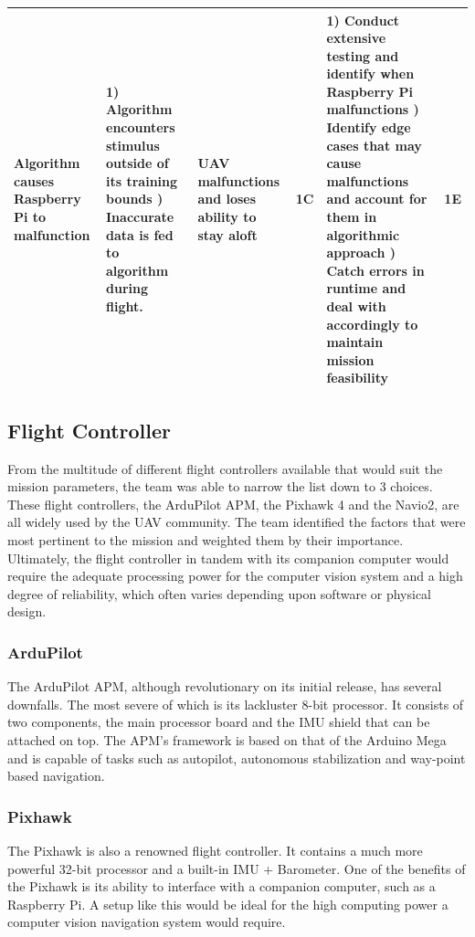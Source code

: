\begin{table}[]
{\begin{tabularx}{\linewidth}{XXXlXl}
                Algorithm causes Raspberry Pi to malfunction & 1) Algorithm encounters stimulus outside of its training bounds \newline 2) Inaccurate data is fed to algorithm during flight. & UAV malfunctions and loses ability to stay aloft & \cellcolor{red!25} 1C & 1) Conduct extensive testing and identify when Raspberry Pi malfunctions \newline 2) Identify edge cases that may cause malfunctions and account for them in algorithmic approach \newline 3) Catch errors in runtime and deal with accordingly to maintain mission feasibility & \cellcolor{green!25} 1E \\
                \bottomrule
                \end{tabularx}
                }
            \end{table}
	    
	\subsection{Flight Controller}
		From the multitude of different flight controllers available that would suit the mission parameters, the team was able to narrow the list down to 3 choices. These flight controllers, the ArduPilot APM, the Pixhawk 4 and the Navio2, are all widely used by the UAV community. The team identified the factors that were most pertinent to the mission and weighted them by their importance. Ultimately, the flight controller in tandem with its companion computer would require the adequate processing power for the computer vision system and a high degree of reliability, which often varies depending upon software or physical design.

		\subsubsection{ArduPilot}
			The ArduPilot APM, although revolutionary on its initial release, has several downfalls. The most severe of which is its lackluster 8-bit processor. It consists of two components, the main processor board and the IMU shield that can be attached on top. The APM’s framework is based on that of the Arduino Mega and is capable of tasks such as autopilot, autonomous stabilization and way-point based navigation.

		\subsubsection{Pixhawk}
			The Pixhawk is also a renowned flight controller. It contains a much more powerful 32-bit processor and a built-in IMU + Barometer. One of the benefits of the Pixhawk is its ability to interface with a companion computer, such as a Raspberry Pi. A setup like this would be ideal for the high computing power a computer vision navigation system would require.

